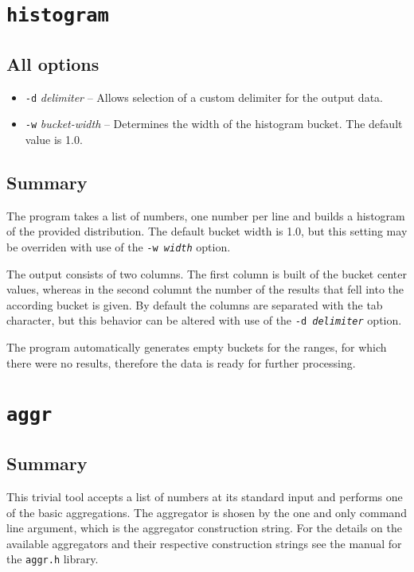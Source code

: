 \documentclass{report}
\begin{document}
\section{\texttt{histogram}}

	\subsection{All options}
	\begin{itemize}
		\item \texttt{-d} \textit{delimiter} -- Allows selection of a custom
			delimiter for the output data.
		\item \texttt{-w} \textit{bucket-width} -- Determines the width of the
			histogram bucket. The default value is 1.0.
	\end{itemize}

	\subsection{Summary}
	The program takes a list of numbers, one number per line and builds
	a histogram of the provided distribution. The default bucket width is 1.0,
	but this setting may be overriden with use of the \texttt{-w \textit{width}}
	option.

	The output consists of two columns. The first column is built of the bucket
	center values, whereas in the second columnt the number of the results that
	fell into the according bucket is given. By default the columns are separated
	with the tab character, but this behavior can be altered with use of the
	\texttt{-d \textit{delimiter}} option.

	The program automatically generates empty buckets for the ranges, for which
	there were no results, therefore the data is ready for further processing.

\section{\texttt{aggr}}

	\subsection{Summary}
	This trivial tool accepts a list of numbers at its standard input and performs 
	one of the basic aggregations. The aggregator is shosen by the one and only
	command line argument, which is the aggregator construction string. For the
	details on the available aggregators and their respective construction strings
	see the manual for the \texttt{aggr.h} library.
\end{document}
